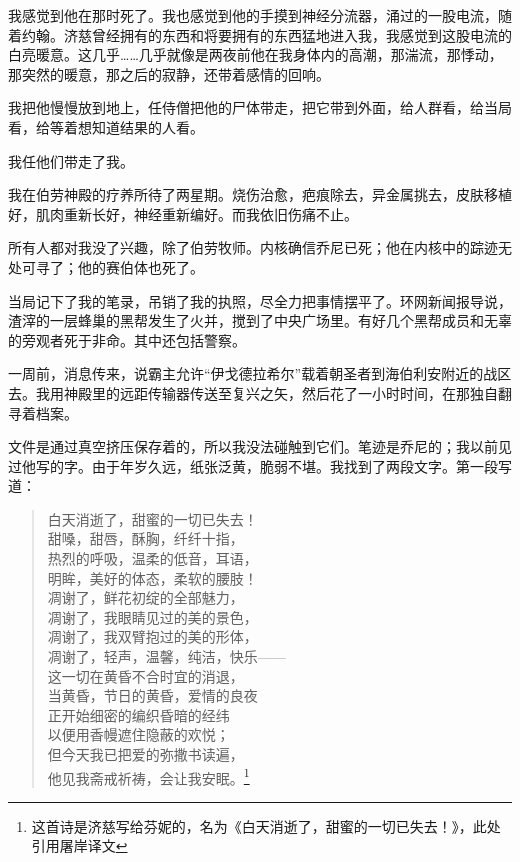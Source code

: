 \documentclass[AutoFakeBold=true]{book}
\begin{document}
我感觉到他在那时死了。我也感觉到他的手摸到神经分流器，涌过的一股电流，随着约翰。济慈曾经拥有的东西和将要拥有的东西猛地进入我，我感觉到这股电流的白亮暖意。这几乎……几乎就像是两夜前他在我身体内的高潮，那湍流，那悸动，那突然的暖意，那之后的寂静，还带着感情的回响。

我把他慢慢放到地上，任侍僧把他的尸体带走，把它带到外面，给人群看，给当局看，给等着想知道结果的人看。

我任他们带走了我。

\vspace*{1em}

我在伯劳神殿的疗养所待了两星期。烧伤治愈，疤痕除去，异金属挑去，皮肤移植好，肌肉重新长好，神经重新编好。而我依旧伤痛不止。

所有人都对我没了兴趣，除了伯劳牧师。内核确信乔尼已死；他在内核中的踪迹无处可寻了；他的赛伯体也死了。

当局记下了我的笔录，吊销了我的执照，尽全力把事情摆平了。环网新闻报导说，渣滓的一层蜂巢的黑帮发生了火并，搅到了中央广场里。有好几个黑帮成员和无辜的旁观者死于非命。其中还包括警察。

一周前，消息传来，说霸主允许``伊戈德拉希尔''载着朝圣者到海伯利安附近的战区去。我用神殿里的远距传输器传送至复兴之矢，然后花了一小时时间，在那独自翻寻着档案。

文件是通过真空挤压保存着的，所以我没法碰触到它们。笔迹是乔尼的；我以前见过他写的字。由于年岁久远，纸张泛黄，脆弱不堪。我找到了两段文字。第一段写道：

\begin{quote}
	{\kaishu 白天消逝了，甜蜜的一切已失去！\\
	甜嗓，甜唇，酥胸，纤纤十指，\\
	热烈的呼吸，温柔的低音，耳语，\\
	明眸，美好的体态，柔软的腰肢！\\
	凋谢了，鲜花初绽的全部魅力，\\
	凋谢了，我眼睛见过的美的景色，\\
	凋谢了，我双臂抱过的美的形体，\\
	凋谢了，轻声，温馨，纯洁，快乐——\\
	这一切在黄昏不合时宜的消退，\\
	当黄昏，节日的黄昏，爱情的良夜\\
	正开始细密的编织昏暗的经纬\\
	以便用香幔遮住隐蔽的欢悦；\\
	但今天我已把爱的弥撒书读遍，\\
	他见我斋戒祈祷，会让我安眠。}\footnote{这首诗是济慈写给芬妮的，名为《白天消逝了，甜蜜的一切已失去！》，此处引用屠岸译文}
\end{quote}
\end{document}

